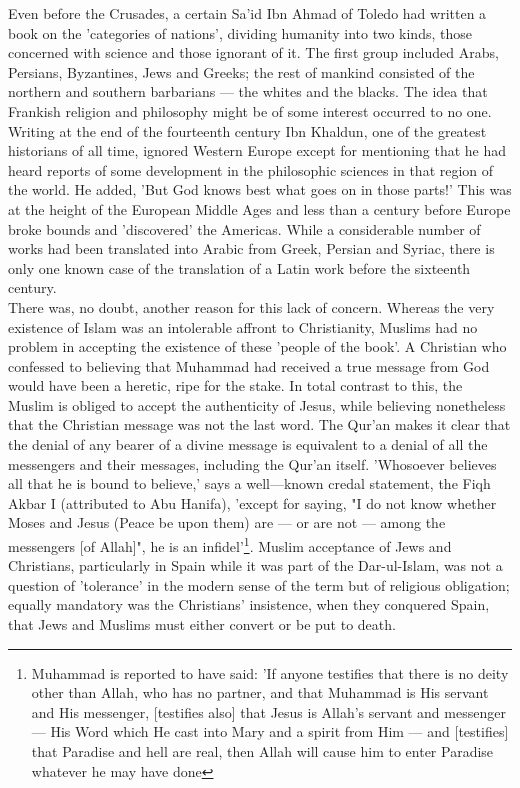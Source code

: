 \documentclass[11pt, b5paper, twoside]{book}
\begin{document}
Even before the Crusades, a certain Sa'id Ibn Ahmad of Toledo had written a book on the 'categories of nations', dividing humanity into two kinds, those concerned with science and those ignorant of it. The first group included Arabs, Persians, Byzantines, Jews and Greeks; the rest of mankind consisted of the northern and southern barbarians --- the whites and the blacks. The idea that Frankish religion and philosophy might be of some interest occurred to no one. Writing at the end of the fourteenth century Ibn Khaldun, one of the greatest historians of all time, ignored Western Europe except for mentioning that he had heard reports of some development in the philosophic sciences in that region of the world. He added, 'But God knows best what goes on in those parts!' This was at the height of the European Middle Ages and less than a century before Europe broke bounds and 'discovered' the Americas. While a considerable number of works had been translated into Arabic from Greek, Persian and Syriac, there is only one known case of the translation of a Latin work before the sixteenth century. \\

There was, no doubt, another reason for this lack of concern. Whereas the very existence of Islam was an intolerable affront to Christianity, Muslims had no problem in accepting the existence of these 'people of the book'. A Christian who confessed to believing that Muhammad had received a true message from God would have been a heretic, ripe for the stake. In total contrast to this, the Muslim is obliged to accept the authenticity of Jesus, while believing nonetheless that the Christian message was not the last word. The Qur'an makes it clear that the denial of any bearer of a divine message is equivalent to a denial of all the messengers and their messages, including the Qur'an itself. 'Whosoever believes all that he is bound to believe,' says a well---known credal statement, the Fiqh Akbar I (attributed to Abu Hanifa), 'except for saying, "I do not know whether Moses and Jesus (Peace be upon them) are --- or are not --- among the messengers [of Allah]", he is an infidel'\footnote{Muhammad is reported to have said: 'If anyone testifies that there is no deity other than Allah, who has no partner, and that Muhammad is His servant and His messenger, [testifies also] that Jesus is Allah's servant and messenger --- His Word which He cast into Mary and a spirit from Him --- and [testifies] that Paradise and hell are real, then Allah will cause him to enter Paradise whatever he may have done}. Muslim acceptance of Jews and Christians, particularly in Spain while it was part of the Dar-ul-Islam, was not a question of 'tolerance' in the modern sense of the term but of religious obligation; equally mandatory was the Christians' insistence, when they conquered Spain, that Jews and Muslims must either convert or be put to death. \\
\end{document}
